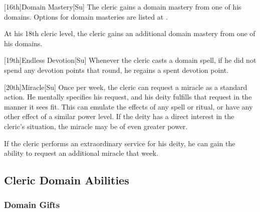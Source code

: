 [16th]{Domain Mastery}[Su]
The cleric gains a domain mastery from one of his domains.
Options for domain masteries are listed at .

At his 18th cleric level, the cleric gains an additional domain mastery from one of his domains.

[19th]{Endless Devotion}[Su]
Whenever the cleric casts a domain spell, if he did not spend any devotion points that round, he regains a spent devotion point.

[20th]{Miracle}[Su]
Once per week, the cleric can request a miracle as a standard action.
He mentally specifies his request, and his deity fulfills that request in the manner it sees fit.
This can emulate the effects of any spell or ritual, or have any other effect of a similar power level.
If the deity has a direct interest in the cleric's situation, the miracle may be of even greater power.

If the cleric performs an extraordinary service for his deity, he can gain the ability to request an additional miracle that week.

\subsection{Cleric Domain Abilities}

\subsubsection{Domain Gifts}\label{Domain Gifts}

